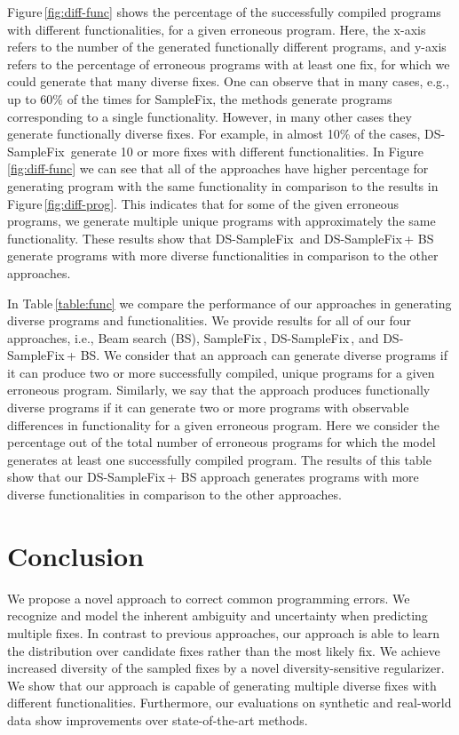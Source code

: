 \documentclass[runningheads]{llncs}
\newcommand{\samplefix}{SampleFix}
\newcommand{\dssmaplefix}{DS-SampleFix}
\newcommand{\figref}{Figure}
\newcommand{\tableref}{Table}
\begin{document}
\figref \,\ref{fig:diff-func} shows the percentage of the successfully compiled programs with different functionalities, for a given erroneous program. Here, the x-axis refers to the number of the generated functionally different programs, and y-axis refers to the percentage of erroneous programs with at least one fix, for which we could generate that many diverse fixes. One can observe that in many cases, e.g., up to 60\% of the times for \samplefix, the methods generate programs corresponding to a single functionality. However, in many other cases they generate functionally diverse fixes. For example, in almost 10\% of the cases, \dssmaplefix\, generate 10 or more fixes with different functionalities.
In \figref \,\ref{fig:diff-func} we can see that all of the approaches have higher percentage for generating program with the same functionality in comparison to the results in \figref \,\ref{fig:diff-prog}. This indicates that for some of the given erroneous programs, we generate multiple unique programs with approximately the same functionality. These results show that \dssmaplefix\, and \dssmaplefix\,+ BS  generate programs with more diverse functionalities in comparison to the other approaches.

In \tableref \,\ref{table:func} we compare the performance of our approaches in generating diverse programs and functionalities. We provide results for all of our four approaches, i.e., Beam search (BS), \samplefix\,, \dssmaplefix\,, and \dssmaplefix\,+ BS. We consider that an approach can generate diverse programs if it can produce two or more successfully compiled, unique programs for a given erroneous program. Similarly, we say that the approach produces functionally diverse programs if it can generate two or more programs with observable differences in functionality for a given erroneous program. Here we consider the percentage out of the total number of erroneous programs for which the model generates at least one successfully compiled program. The results of this table show that our \dssmaplefix\,+ BS approach generates programs with more diverse functionalities in comparison to the other approaches.


\section{Conclusion}
We propose a novel approach to correct common programming errors. We recognize and model the inherent ambiguity and uncertainty when predicting multiple fixes. In contrast to previous approaches, our approach is able to learn the distribution over candidate fixes rather than the most likely fix. 
We achieve increased diversity of the sampled fixes by a novel diversity-sensitive regularizer. We show that our approach is capable of generating multiple diverse fixes with different functionalities. Furthermore, our evaluations on synthetic and real-world data show improvements over state-of-the-art methods.



\end{document}
